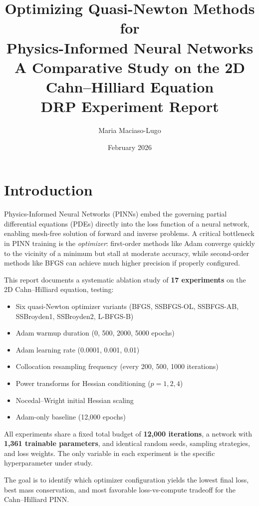 \documentclass[11pt,a4paper]{article}
\title{%
  \textbf{Optimizing Quasi-Newton Methods for\\
  Physics-Informed Neural Networks}\\[6pt]
  \large A Comparative Study on the 2D Cahn--Hilliard Equation\\[4pt]
  \normalsize DRP Experiment Report
}
\author{Maria Maciaso-Lugo}
\date{February 2026}
\begin{document}
\maketitle
\tableofcontents
\newpage

\section{Introduction}
\label{sec:intro}

Physics-Informed Neural Networks (PINNs) embed the governing partial differential
equations (PDEs) directly into the loss function of a neural network, enabling
mesh-free solution of forward and inverse problems.  A critical bottleneck in
PINN training is the \emph{optimizer}: first-order methods like Adam converge
quickly to the vicinity of a minimum but stall at moderate accuracy, while
second-order methods like BFGS can achieve much higher precision if properly
configured.

This report documents a systematic ablation study of \textbf{17 experiments}
on the 2D Cahn--Hilliard equation, testing:
\begin{itemize}[nosep]
  \item Six quasi-Newton optimizer variants (BFGS, SSBFGS-OL, SSBFGS-AB, SSBroyden1, SSBroyden2, L-BFGS-B)
  \item Adam warmup duration (0, 500, 2000, 5000 epochs)
  \item Adam learning rate (0.0001, 0.001, 0.01)
  \item Collocation resampling frequency (every 200, 500, 1000 iterations)
  \item Power transforms for Hessian conditioning ($p = 1, 2, 4$)
  \item Nocedal--Wright initial Hessian scaling
  \item Adam-only baseline (12,000 epochs)
\end{itemize}

All experiments share a fixed total budget of \textbf{12,000 iterations},
a network with \textbf{1,361 trainable parameters}, and identical random
seeds, sampling strategies, and loss weights.  The only variable in each
experiment is the specific hyperparameter under study.

The goal is to identify which optimizer configuration yields the lowest
final loss, best mass conservation, and most favorable loss-vs-compute
tradeoff for the Cahn--Hilliard PINN.
\end{document}
